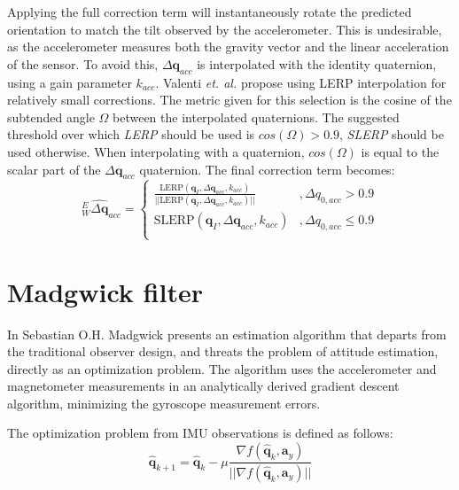 %
Applying the full correction term will instantaneously rotate the predicted orientation to match the tilt observed by the accelerometer. This is undesirable, as the accelerometer measures both the gravity vector and the linear acceleration of the sensor. To avoid this, $\Delta \boldsymbol{q}_{acc}$ is interpolated with the identity quaternion, using a gain parameter $k_{acc}$. Valenti \textit{et. al.} propose using LERP interpolation for relatively small corrections. The metric given for this selection is the cosine of the subtended angle $\Omega$ between the interpolated quaternions. The suggested threshold over which  \textit{LERP} should be used is $cos(\Omega) > 0.9$, \textit{SLERP} should be used otherwise. When interpolating with a quaternion, $cos(\Omega)$ is equal to the scalar part of the $\Delta \boldsymbol{q}_{acc}$ quaternion. The final correction term becomes:
\begin{equation}
	{}^{E}_{W}\widehat{\Delta\boldsymbol{q}}_{acc} = \begin{cases}
		\frac{\text{LERP}(\boldsymbol{q}_I, \Delta \boldsymbol{q}_{acc}, k_{acc})}{||\text{LERP}(\boldsymbol{q}_I, \Delta \boldsymbol{q}_{acc}, k_{acc})||} & , \Delta q_{0, acc} > 0.9    \\
		\text{SLERP}(\boldsymbol{q}_I,\Delta \boldsymbol{q}_{acc}, k_{acc})                                                                                   & , \Delta q_{0, acc} \leq 0.9 \\
	\end{cases}
\end{equation}

\section{Madgwick filter}

In \cite{Madgwick2010AnEO} Sebastian O.H. Madgwick presents an estimation algorithm that departs from the traditional observer design, and threats the problem of attitude estimation, directly as an optimization problem. The algorithm uses the accelerometer and magnetometer measurements in an analytically derived gradient descent algorithm, minimizing the gyroscope measurement errors.

The optimization problem from IMU observations is defined as follows:
\begin{equation}
	\hat{\boldsymbol{q}}_{k+1} = \hat{\boldsymbol{q}}_{k} - \mu\frac{\nabla f(\hat{\boldsymbol{q}}_{k}, \boldsymbol{a}_y)}{||\nabla f(\hat{\boldsymbol{q}}_{k}, \boldsymbol{a}_y)||}
\end{equation}

